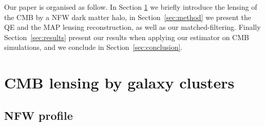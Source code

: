 \documentclass[prd, superscriptaddress, tightenlines, longbibliography, nofootinbib, eqsecnum, amsfonts, amsmath, floatfix, twocolumn, notitlepage]{revtex4-2}
\begin{document}

Our paper is organised as follow. In Section \ref{sec:model} we briefly introduce the lensing of the CMB by a NFW dark matter halo, in Section~\ref{sec:method} we present the QE and the MAP lensing reconstruction, as well as our matched-filtering. Finally Section~\ref{sec:results} present our results when applying our estimator on CMB simulations, and we conclude in Section~\ref{sec:conclusion}.


\section{CMB lensing by galaxy clusters}
\label{sec:model}
\subsection{NFW profile}
\end{document}
